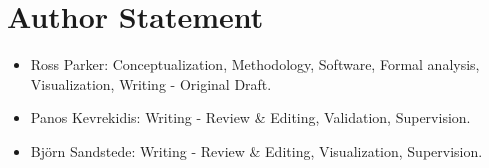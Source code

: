 \documentclass[12pt]{article}
\begin{document}
\section*{Author Statement}

\begin{itemize}

\item Ross Parker: Conceptualization, Methodology, Software, Formal analysis, Visualization, Writing - Original Draft. 

\item Panos Kevrekidis: Writing - Review \& Editing, Validation, Supervision. 

\item Bj{\"o}rn Sandstede: Writing - Review \& Editing, Visualization, Supervision.

\end{itemize}
\end{document}
